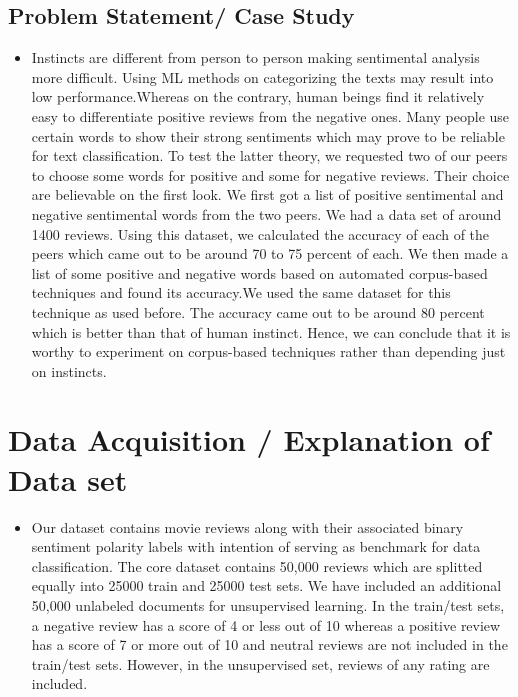 \documentclass{article}
\begin{document}
\subsection{Problem Statement/ Case Study}
\begin{itemize}
    \item Instincts are different from person to person making sentimental analysis more difficult. Using ML methods on categorizing the texts may result into low performance.Whereas on the contrary, human beings find it relatively easy to differentiate positive reviews from the negative ones. Many people use certain words to show their strong sentiments which may prove to be reliable for text classification. To test the latter theory, we requested two of our peers to choose some words for positive and some for negative reviews. Their choice are believable on the first look. We first got a list of positive sentimental and negative  sentimental words from the two peers. We had a data set of around 1400 reviews. Using this dataset, we calculated the accuracy of each of the peers which came out to be around 70 to 75 percent of each. We then made a list of some positive and negative words based on automated corpus-based techniques and found its accuracy.We used the same dataset for this technique as used before. The accuracy came out to be around 80 percent which is better than that of human instinct. Hence, we can conclude that it is worthy to experiment on corpus-based techniques rather than depending just on instincts.
\end{itemize}

\section{Data Acquisition / Explanation of Data set }
\begin{itemize}
    \item Our dataset contains movie reviews along with their associated binary sentiment polarity labels with intention of serving as benchmark for data classification. The core dataset contains 50,000 reviews which are splitted equally into 25000 train and 25000 test sets. We have included an additional 50,000 unlabeled documents for unsupervised learning. In the train/test sets, a negative review has a score of 4 or less out of 10 whereas a positive review has a score of 7 or more out of 10 and neutral reviews are not included in the train/test sets. However, in the unsupervised set, reviews of any rating are included.
\end{itemize}
\end{document}
